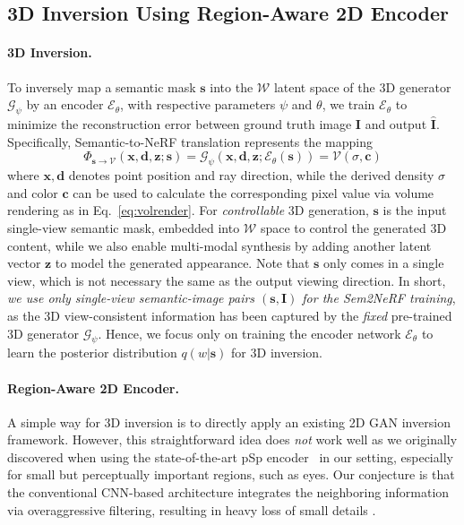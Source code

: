 \documentclass[runningheads]{llncs}
\begin{document}
\subsection{3D Inversion Using Region-Aware 2D Encoder}\label{sec:method_enc}

\paragraph{\textbf{3D Inversion.}} To inversely map a semantic mask $\mathbf{s}$ into the $\mathcal{W}$ latent space of the 3D generator $\mathcal{G}_\psi$ by an encoder  $\mathcal{E}_\theta$, with respective parameters $\psi$ and $\theta$, we train $\mathcal{E}_\theta$ to minimize the reconstruction error between ground truth image $\mathbf{I}$ and output  $\hat{\mathbf{I}}$. Specifically, Semantic-to-NeRF translation represents the mapping 
\begin{equation} \label{eq:s2n_mapping}
\Phi_{\mathbf{s}\to\mathcal{V}}(\mathbf{x},\mathbf{d},\mathbf{z};\mathbf{s})=\mathcal{G}_\psi(\mathbf{x},\mathbf{d},\mathbf{z};\mathcal{E}_\theta(\mathbf{s}))=\mathcal{V}(\sigma,\mathbf{c})
\end{equation}
where $\mathbf{x}, \mathbf{d}$ denotes point position and ray direction, while the derived density $\sigma$ and color $\bm{c}$ can be used to calculate the corresponding pixel value via volume rendering as in Eq.~\eqref{eq:volrender}. For \emph{controllable} 3D generation, $\mathbf{s}$ is the input single-view semantic mask, embedded into $\mathcal{W}$ space to control the generated 3D content, while we also enable multi-modal synthesis by adding another latent vector $\mathbf{z}$ to model the generated appearance. Note that $\mathbf{s}$ only comes in a single view, which is not necessary the same as the output viewing direction. In short, \emph{we use only single-view semantic-image pairs $(\mathbf{s}, \mathbf{I})$ for the Sem2NeRF training}, as the 3D view-consistent information has been captured by the \emph{fixed} pre-trained 3D generator $\mathcal{G}_\psi$. Hence, we focus only on training the encoder network $\mathcal{E}_\theta$ to learn the posterior distribution $q(w|\mathbf{s})$ for 3D inversion.

\paragraph{\textbf{Region-Aware 2D Encoder.}} A simple way for 3D inversion is to directly apply an existing 2D GAN inversion framework. However, this straightforward idea does \emph{not} work well
as we originally discovered when using the state-of-the-art pSp encoder~\cite{richardson2021encoding} in our setting,
especially for small but perceptually important regions, such as eyes. Our conjecture is that the conventional CNN-based architecture integrates the neighboring information via overaggressive filtering, resulting in heavy loss of small details \cite{zhang2019making}. 
\end{document}
